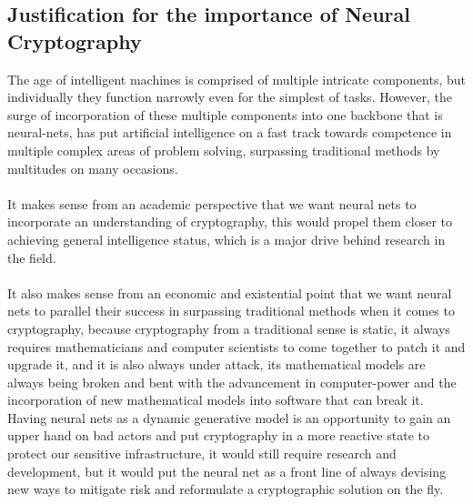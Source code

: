 \documentclass[a4paper, 12pt]{report}
\begin{document}
\subsection{\textbf{Justification for the importance of Neural Cryptography}}
The age of intelligent machines is comprised of multiple intricate components, but individually they function narrowly even for the simplest of tasks. However, the surge of incorporation of these multiple components into one backbone that is neural-nets, has put artificial intelligence on a fast track towards competence in multiple complex areas of problem solving, surpassing traditional methods by multitudes on many occasions.\\\\
It makes sense from an academic perspective that we want neural nets to incorporate an understanding of cryptography, this would propel them closer to achieving general intelligence status, which is a major drive behind research in the field.\\\\
It also makes sense from an economic and existential point that we want neural nets to parallel their success in surpassing traditional methods when it comes to cryptography, because cryptography from a traditional sense is static, it always requires mathematicians and computer scientists to come together to patch it and upgrade it, and it is also always under attack, its mathematical models are always being broken and bent with the advancement in computer-power and the incorporation of new mathematical models into software that can break it.\\
Having neural nets as a dynamic generative model is an opportunity to gain an upper hand on bad actors and put cryptography in a more reactive state to protect our sensitive infrastructure, it would still require research and development, but it would put the neural net as a front line of always devising new ways to mitigate risk and reformulate a cryptographic solution on the fly.
\end{document}
